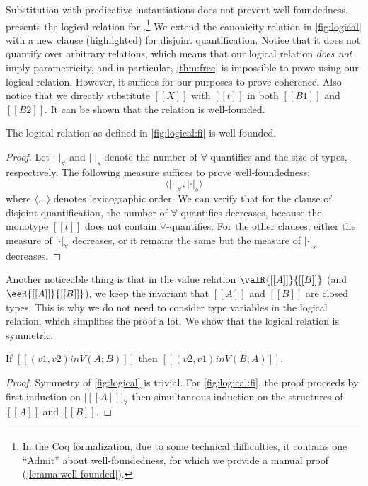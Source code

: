 Substitution with predicative instantiations does not prevent well-foundedness.
 presents the logical relation for \fnamee.\footnote{In the
  Coq formalization, due to some technical difficulties, it contains one
  ``Admit'' about well-foundedness, for which we provide a manual proof
  (\cref{lemma:well-founded}).} We extend the canonicity relation in
\cref{fig:logical} with a new clause (highlighted) for disjoint quantification.
Notice that it does not quantify over arbitrary relations, which means that our
logical relation \emph{does not} imply parametricity, and in particular,
\cref{thm:free} is impossible to prove using our logical relation. However, it
suffices for our purposes to prove coherence. Also notice that we directly
substitute $[[X]]$ with $[[t]]$ in both $[[B1]]$ and $[[B2]]$. It can be shown
that the relation is well-founded.

\begin{lemma} \label{lemma:well-founded}
  The logical relation as defined in \cref{fig:logical:fi} is well-founded.
\end{lemma}
\begin{proof}
  Let $| \cdot |_{\forall}$ and $| \cdot |_s$ denote the number of
  $\forall$-quantifies and the size of types, respectively. The following
  measure suffices to prove well-foundedness:
  \[
\langle | \cdot |_{\forall} ,  | \cdot |_s   \rangle
  \]
  where $\langle \dots \rangle$ denotes lexicographic order. We can verify that
  for the clause of disjoint quantification, the number of $\forall$-quantifies
  decreases, because the monotype $[[t]]$ does not contain $\forall$-quantifies.
  For the other clauses, either the measure of $| \cdot |_{\forall}$ decreases,
  or it remains the same but the measure of $| \cdot |_s$ decreases.
\end{proof}


Another noticeable thing is that in the value relation $ \valR{[[A]]}{[[B]]} $
(and $\eeR{[[A]]}{[[B]]} $), we keep the invariant that $[[A]]$ and $[[B]]$
are closed types. This is why we do not need to consider type variables in the
logical relation, which simplifies the proof a lot. We show that the logical
relation is symmetric.


\begin{lemma}
  If $[[ (v1, v2) in V ( A ; B ) ]]$ then $[[ (v2, v1) in V ( B ; A ) ]]$.
\end{lemma}
\begin{proof}
  Symmetry of \cref{fig:logical} is trivial. For \cref{fig:logical:fi}, the
  proof proceeds by first induction on $ | [[A]] |_{\forall} $ then simultaneous
  induction on the structures of $[[A]]$ and $[[B]]$.
\end{proof}

